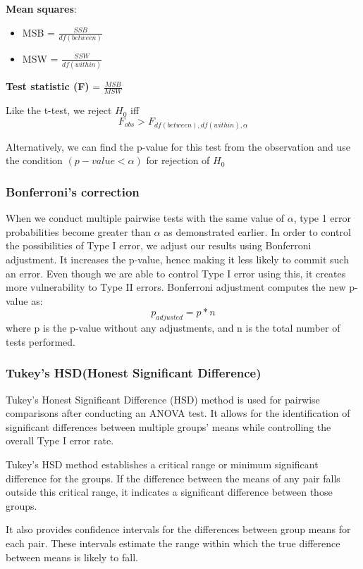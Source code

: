 \documentclass[fontsize=12 pt]{scrartcl}
\begin{document}
\textbf{Mean squares}:
\begin{itemize}
\item MSB = $\frac{SSB}{df(between)}$
\item MSW = $\frac{SSW}{df(within)}$
\end{itemize}

\textbf{Test statistic (F)} = $\frac{MSB}{MSW}$

Like the t-test, we reject $H_0$ iff
\[  F_{obs} > F_{df(between), df(within), \alpha } \]

Alternatively, we can find the p-value for this test from the observation and use the condition $(p-value < \alpha)$ for rejection of $H_0$

\subsubsection{Bonferroni's correction}
When we conduct multiple pairwise tests with the same value of $\alpha$, type 1 error probabilities become greater than $\alpha$ as demonstrated earlier. In order to control the possibilities of Type I error, we adjust our results using Bonferroni adjustment. It increases the p-value, hence making it less likely
to commit such an error. Even though we are able to control Type I error using this, it creates more vulnerability to Type II errors. Bonferroni adjustment computes the new p-value as:
\[ p_{adjusted} = p*n \]
where p is the p-value without any adjustments, and n is the total number of tests performed. \citep[p.~293]{chris}

\subsubsection{Tukey's HSD(Honest Significant Difference)}
Tukey's Honest Significant Difference (HSD) method is used for pairwise comparisons after conducting an ANOVA test. It allows for the identification of significant differences between multiple groups' means while controlling the overall Type I error rate.

Tukey's HSD method establishes a critical range or minimum significant difference for the groups. If the difference between the means of any pair falls outside this critical range, it indicates a significant difference between those groups. 

It also provides confidence intervals for the differences between group means for each pair. These intervals estimate the range within which the true difference between means is likely to fall. \citep{tukey}
\end{document}

